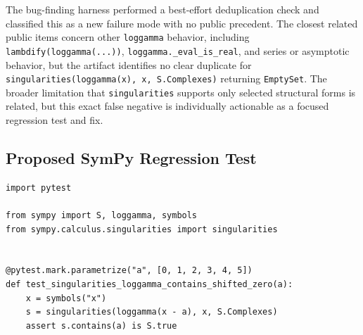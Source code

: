 \documentclass[11pt]{article}
\begin{document}
The bug-finding harness performed a best-effort deduplication check and
classified this as a new failure mode with no public precedent. The closest
related public items concern other \texttt{loggamma} behavior, including
\texttt{lambdify(loggamma(...))}, \texttt{loggamma.\_eval\_is\_real}, and
series or asymptotic behavior, but the artifact identifies no clear duplicate
for \texttt{singularities(loggamma(x), x, S.Complexes)} returning
\texttt{EmptySet}. The broader limitation that \texttt{singularities} supports
only selected structural forms is related, but this exact false negative is
individually actionable as a focused regression test and fix.

\subsection{Proposed SymPy Regression Test}

\medskip

\begin{lstlisting}[style=bugpython]
import pytest

from sympy import S, loggamma, symbols
from sympy.calculus.singularities import singularities


@pytest.mark.parametrize("a", [0, 1, 2, 3, 4, 5])
def test_singularities_loggamma_contains_shifted_zero(a):
    x = symbols("x")
    s = singularities(loggamma(x - a), x, S.Complexes)
    assert s.contains(a) is S.true
\end{lstlisting}
\end{document}
